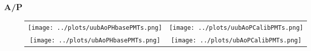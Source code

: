 \documentclass[aspectratio=169]{beamer}
\begin{document}
%

\begin{frame}
  \frametitle{A/P}
  \begin{figure}
    \centering
    \begin{tabularx}{\textwidth}{CC}
      \texttt{[image: ../plots/uubAoPHbasePMTs.png]}
      &
      \texttt{[image: ../plots/uubAoPCalibPMTs.png]}
      \\
      \texttt{[image: ../plots/ubAoPHbasePMTs.png]}
      &
      \texttt{[image: ../plots/ubAoPCalibPMTs.png]}
    \end{tabularx}
  \end{figure}
  \centering
  
\end{frame}
\end{document}
